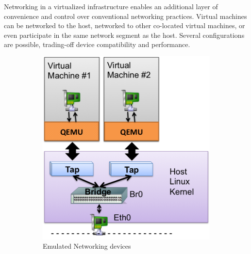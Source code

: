 \begin{enumerate}
Networking in a virtualized infrastructure enables an additional layer of convenience and control over conventional networking practices. Virtual machines can be networked to the host, networked to other co-located virtual machines, or even participate in the same network segment as the host. Several configurations are possible, trading-off device compatibility and performance.\begin{figure}
        \centering
        \begin{subfigure}[b]{0.35\textwidth}
                \includegraphics[width=\textwidth]{kvm-emulated.png}
                \caption{Emulated Networking devices}
                \label{fig:kvm-emulated}
        \end{subfigure}%
        ~ %
        \qquad \hspace{8 mm}
        \begin{subfigure}[b]{0.35\textwidth}

\end{subfigure}
\end{figure}
\end{enumerate}
